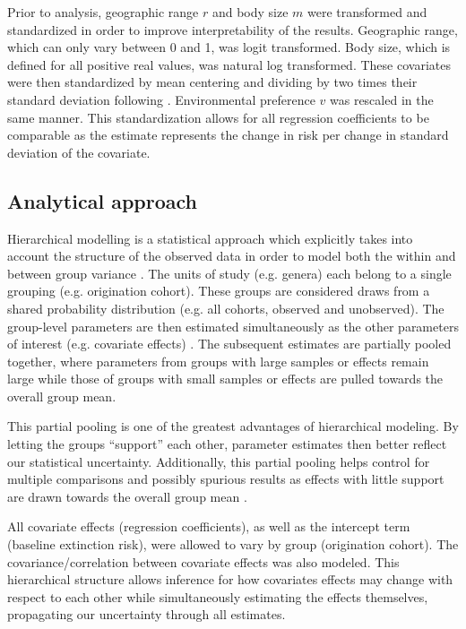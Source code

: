 \documentclass[12pt,letterpaper]{article}
\begin{document}
Prior to analysis, geographic range \(r\) and body size \(m\) were transformed and standardized in order to improve interpretability of the results. Geographic range, which can only vary between 0 and 1, was logit transformed. Body size, which is defined for all positive real values, was natural log transformed. These covariates were then standardized by mean centering and dividing by two times their standard deviation following \citet{Gelman2007}. Environmental preference \(v\) was rescaled in the same manner. This standardization allows for all regression coefficients to be comparable as the estimate represents the change in risk per change in standard deviation of the covariate.


\subsection{Analytical approach}

Hierarchical modelling is a statistical approach which explicitly takes into account the structure of the observed data in order to model both the within and between group variance \citep{Gelman2013d,Gelman2007}. The units of study (e.g. genera) each belong to a single grouping (e.g. origination cohort). These groups are considered draws from a shared probability distribution (e.g. all cohorts, observed and unobserved). The group-level parameters are then estimated simultaneously as the other parameters of interest (e.g. covariate effects) \citep{Gelman2013d}. The subsequent estimates are partially pooled together, where parameters from groups with large samples or effects remain large while those of groups with small samples or effects are pulled towards the overall group mean. 

This partial pooling is one of the greatest advantages of hierarchical modeling. By letting the groups ``support'' each other, parameter estimates then better reflect our statistical uncertainty. Additionally, this partial pooling helps control for multiple comparisons and possibly spurious results as effects with little support are drawn towards the overall group mean \citep{Gelman2013d,Gelman2007}. 

All covariate effects (regression coefficients), as well as the intercept term (baseline extinction risk), were allowed to vary by group (origination cohort). The covariance/correlation between covariate effects was also modeled. This hierarchical structure allows inference for how covariates effects may change with respect to each other while simultaneously estimating the effects themselves, propagating our uncertainty through all estimates. 
\end{document}
